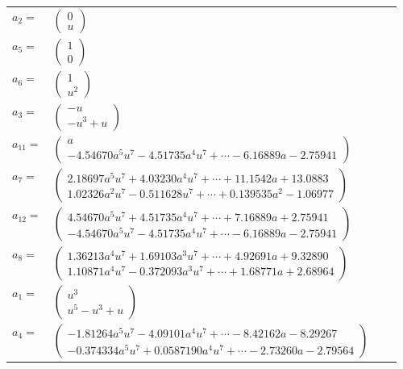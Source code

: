 \documentclass[1p]{elsarticle_modified}
\theoremstyle{definition}
\begin{document}
\begin{tabular}{m{7pt} m{180pt} m{7pt} m{180pt} }
\flushright $a_{2}=$&$\begin{pmatrix}0\\u\end{pmatrix}$ \\
\flushright $a_{5}=$&$\begin{pmatrix}1\\0\end{pmatrix}$ \\
\flushright $a_{6}=$&$\begin{pmatrix}1\\u^2\end{pmatrix}$ \\
\flushright $a_{3}=$&$\begin{pmatrix}- u\\- u^3+u\end{pmatrix}$ \\
\flushright $a_{11}=$&$\begin{pmatrix}a\\-4.54670 a^{5} u^{7}-4.51735 a^{4} u^{7}+\cdots-6.16889 a-2.75941\end{pmatrix}$ \\
\flushright $a_{7}=$&$\begin{pmatrix}2.18697 a^{5} u^{7}+4.03230 a^{4} u^{7}+\cdots+11.1542 a+13.0883\\1.02326 a^{2} u^{7}-0.511628 u^{7}+\cdots+0.139535 a^{2}-1.06977\end{pmatrix}$ \\
\flushright $a_{12}=$&$\begin{pmatrix}4.54670 a^{5} u^{7}+4.51735 a^{4} u^{7}+\cdots+7.16889 a+2.75941\\-4.54670 a^{5} u^{7}-4.51735 a^{4} u^{7}+\cdots-6.16889 a-2.75941\end{pmatrix}$ \\
\flushright $a_{8}=$&$\begin{pmatrix}1.36213 a^{4} u^{7}+1.69103 a^{3} u^{7}+\cdots+4.92691 a+9.32890\\1.10871 a^{4} u^{7}-0.372093 a^{3} u^{7}+\cdots+1.68771 a+2.68964\end{pmatrix}$ \\
\flushright $a_{1}=$&$\begin{pmatrix}u^3\\u^5- u^3+u\end{pmatrix}$ \\
\flushright $a_{4}=$&$\begin{pmatrix}-1.81264 a^{5} u^{7}-4.09101 a^{4} u^{7}+\cdots-8.42162 a-8.29267\\-0.374334 a^{5} u^{7}+0.0587190 a^{4} u^{7}+\cdots-2.73260 a-2.79564\end{pmatrix}$ \\

\end{tabular}
\end{document}

